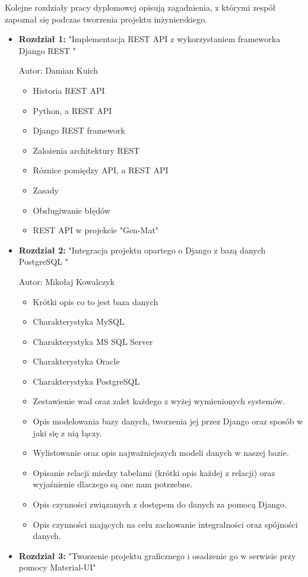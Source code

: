 \documentclass[oneside,polski,logo,indent]{amuthesis}
\begin{document}
Kolejne rozdziały pracy dyplomowej opisują zagadnienia, z którymi zespół zapoznał
się podczas tworzenia projektu inżynierskiego.

\begin{itemize}
\item \textbf{Rozdział 1:} "Implementacja REST API z wykorzystaniem frameworka Django REST "


Autor: Damian Kuich 
\begin{itemize}
\item Historia REST API
\item Python, a REST API
\item  Django REST framework
\item Zalożenia architektury REST
\item Róznice pomiędzy API, a REST API
\item Zasady
\item Obsługiwanie błędów
\item REST API w projekcie "Gen-Mat"

\end{itemize}
\item \textbf{Rozdział 2:} "Integracja projektu opartego o Django z bazą danych PostgreSQL "


Autor: Mikołaj Kowalczyk
\begin{itemize}
\item Krótki opis co to jest baza danych
\item Charakterystyka MySQL
\item Charakterystyka MS SQL Server
\item Charakterystyka Oracle 
\item Charakterystyka PostgreSQL
\item Zestawienie wad oraz zalet każdego z wyżej wymienionych systemów.
\item Opis modelowania bazy danych, tworzenia jej przez Django oraz sposób w jaki się z nią łączy.
\item Wylistowanie oraz opis najważniejszych modeli danych w naszej bazie.
\item Opisanie relacji miedzy tabelami (krótki opis każdej z relacji) oraz wyjaśnienie dlaczego są one nam potrzebne.
\item Opis czynności związanych z dostępem do danych za pomocą Django.
\item Opis czynności mających na celu zachowanie integralności oraz spójności danych.
\end{itemize}
\item \textbf{Rozdział 3:} "Tworzenie projektu graficznego i osadzenie go w serwisie przy pomocy Material-UI"



\end{itemize}
\end{document}
